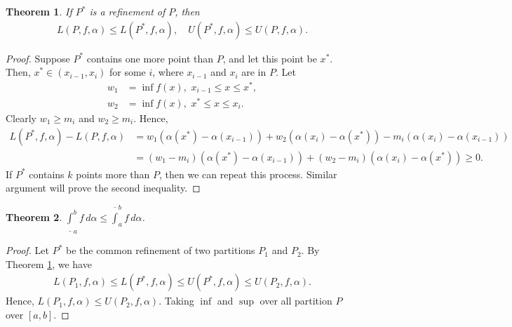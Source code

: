 \documentclass[10pt]{book}
\newtheorem{theorem}{Theorem}[chapter]
\theoremstyle{definition}
\numberwithin{equation}{chapter}
\begin{document}
\begin{theorem}\label{th_51}
If $P^*$ is a refinement of $P$, then 
\begin{align*}
    L(P,f,\alpha) \leq L(P^*,f,\alpha), \quad U(P^*,f,\alpha) \leq U(P,f,\alpha).
\end{align*}
\end{theorem}
\begin{proof}
Suppose $P^*$ contains one more point than $P$, and let this point be $x^*$. Then, $x^* \in (x_{i-1}, x_i)$ for some $i$, where $x_{i-1}$ and $x_i$ are in $P$. Let
\begin{align*}
    w_1 & = \inf f(x), \,\, x_{i-1} \leq x \leq x^*, \\
    w_2 & = \inf f(x), \,\, x^* \leq x \leq x_{i}.
\end{align*}
Clearly $w_1 \geq m_i$ and $w_2 \geq m_i$. Hence,
\begin{align*}
    L(P^*,f,\alpha) - L(P,f,\alpha) & = w_1 \left(\alpha(x^*) - \alpha(x_{i-1})\right) + w_2 \left(\alpha(x_i) - \alpha(x^*)\right) - m_i \left(\alpha(x_i) - \alpha(x_{i-1})\right) \\
    & = (w_1 - m_i) \left(\alpha(x^*) - \alpha(x_{i-1})\right) + (w_2 - m_i) \left(\alpha(x_i) - \alpha(x^*)\right) \geq 0.
\end{align*}
If $P^*$ contains $k$ points more than $P$, then we can repeat this process. Similar argument will prove the second inequality.
\end{proof}

\medskip

\begin{theorem}
$\displaystyle \underline{\int}^b_a f \,d\alpha \leq \overline{\int}^b_a f \,d\alpha$.
\end{theorem}
\begin{proof}
Let $P^*$ be the common refinement of two partitions $P_1$ and $P_2$. By Theorem \ref{th_51}, we have
\begin{align*}
    L(P_1,f,\alpha) \leq L(P^*,f,\alpha) \leq U(P^*,f,\alpha) \leq U(P_2,f,\alpha).
\end{align*}
Hence, $L(P_1,f,\alpha) \leq U(P_2,f,\alpha)$. Taking $\inf$ and $\sup$ over all partition $P$ over $[a,b]$.
\end{proof}

\medskip
\end{document}
